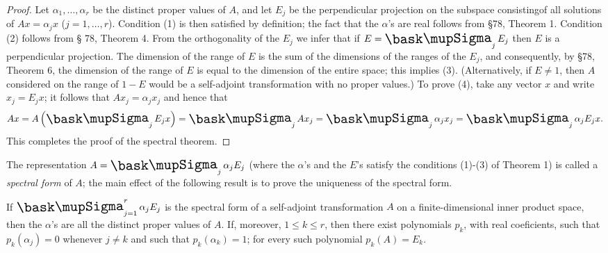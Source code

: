 \begin{proof}
    Let \(\alpha_1, \ldots, \alpha_r\) be the distinct proper values of \(A\),
    and let \(E_j\) be the perpendicular projection on the subspace consistingof
    all solutions of \(Ax = \alpha_j x\) (\(j = 1, \ldots, r\)). Condition (1)
    is then satisfied by definition; the fact that the \(\alpha\)'s are real
    follows from §78, Theorem 1. Condition (2) follows from § 78, Theorem 4.
    From the orthogonality of the \(E_j\) we infer that if \(E = \sumx_j E_j\)
    then \(E\) is a perpendicular projection. The dimension of the range of
    \(E\) is the sum of the dimensions of the ranges of the \(E_j\), and
    consequently, by §78, Theorem 6, the dimension of the range of \(E\) is
    equal to the dimension of the entire space; this implies (3).
    (Alternatively, if \(E \neq 1\), then \(A\) considered on the range of \(1 -
    E\) would be a self-adjoint transformation with no proper values.) To prove
    (4), take any vector \(x\) and write \(x_j = E_j x\); it follows that \(Ax_j
    = \alpha_j x_j\) and hence that
    \begin{equation*}
        Ax = A\left(\sumx_j E_j x\right) = \sumx_j Ax_j = \sumx_j \alpha_j x_j
        = \sumx_j \alpha_j E_j x.
    \end{equation*}
    This completes the proof of the spectral theorem.
\end{proof}

The representation \(A = \sumx_j \alpha_j E_j\) (where the \(\alpha\)'s and the
\(E\)'s satisfy the conditions (1)-(3) of Theorem 1) is called a \emph{spectral
form} of \(A\); the main effect of the following result is to prove the
uniqueness of the spectral form.

\begin{theorem}
    If \(\sumx_{j=1}^r \alpha_j E_j\) is the spectral form of a self-adjoint transformation \(A\) on a finite-dimensional inner product space, then the \(\alpha\)'s are all the distinct proper values of \(A\). If, moreover, \(1 \leq k \leq r\), then there exist polynomials \(p_k\), with real coeficients, such that \(p_k(\alpha_j) = 0\) whenever \(j \neq k\) and such that \(p_k(\alpha_k) = 1\); for every such polynomial \(p_k(A) = E_k\).
\end{theorem}


